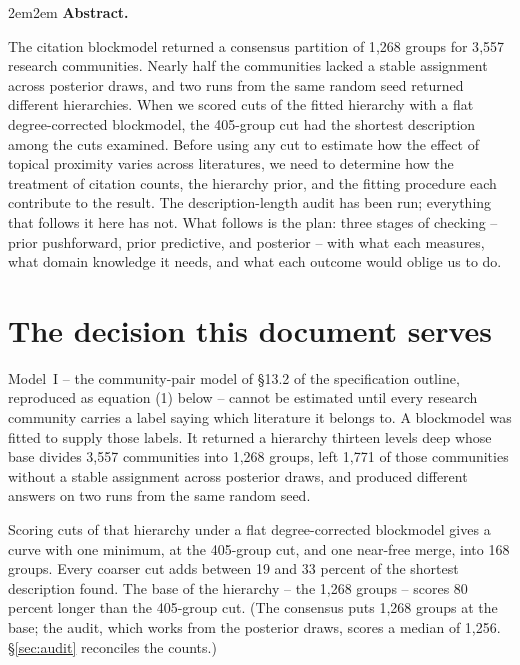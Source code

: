 \documentclass[11pt]{article}
\title{\vspace{-1.5em}#1}
\author{
  \shortstack{
    Jonathan H. Morgan, Ph.D.$^{1}$ \quad Sarah Delmar, Ph.D.$^{2}$
  }
}
\date{
  $^1$\,Duke Network Analysis Center\\
  $^2$\,Department of Psychology, University of Chicago\\
  \today
}
\newenvironment{springerabstract}{
  \begin{adjustwidth}{2em}{2em}
  \noindent\textbf{Abstract.}\hspace{0.5em}\justifying
}{
  \end{adjustwidth}
}
\begin{document}
\maketitle

\begin{springerabstract}
The citation blockmodel returned a consensus partition of 1{,}268 groups for
3{,}557 research communities. Nearly half the communities lacked a stable
assignment across posterior draws, and two runs from the same random seed
returned different hierarchies. When we scored cuts of the fitted hierarchy
with a flat degree-corrected blockmodel, the 405-group cut had the shortest
description among the cuts examined. Before using any cut to estimate how the
effect of topical proximity varies across literatures, we need to determine how
the treatment of citation counts, the hierarchy prior, and the fitting
procedure each contribute to the result. The description-length audit has been run; everything that follows it here
has not. What follows is the plan: three stages of checking -- prior
pushforward, prior predictive, and posterior -- with what each measures, what
domain knowledge it needs, and what each outcome would oblige us to do.
\end{springerabstract}

\tableofcontents
\clearpage

\section{The decision this document serves}

Model~I -- the community-pair model of \S13.2 of the specification outline,
reproduced as equation (1) below -- cannot be estimated until every research
community carries a label saying which literature it belongs to. A blockmodel was fitted to supply those
labels. It returned a hierarchy thirteen levels deep whose base divides 3{,}557
communities into 1{,}268 groups, left 1{,}771 of those communities without a
stable assignment across posterior draws, and produced different answers on two
runs from the same random seed.

Scoring cuts of that hierarchy under a flat degree-corrected blockmodel gives a
curve with one minimum, at the 405-group cut, and one near-free merge, into 168
groups. Every coarser cut adds between 19 and 33 percent of the shortest description
found. The base of the hierarchy -- the 1{,}268 groups -- scores
80 percent longer than the 405-group cut. (The consensus puts 1{,}268 groups
at the base; the audit, which works from the posterior draws, scores a median
of 1{,}256. \S\ref{sec:audit} reconciles the counts.)
\end{document}
